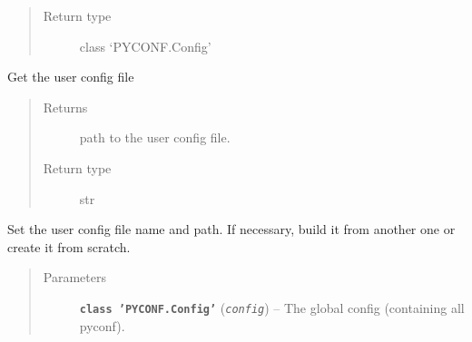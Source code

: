 \documentclass[a4paper,10pt,english]{sphinxmanual}
\begin{document}
\begin{fulllineitems}
\begin{fulllineitems}
\begin{quote}
\begin{description}
\item[{Return type}] \leavevmode
class `PYCONF.Config'

\end{description}\end{quote}

\end{fulllineitems}


\begin{fulllineitems}
\label{commands/apidoc/src:src.configManager.ConfigManager.get_user_config_file}
Get the user config file
\begin{quote}\begin{description}
\item[{Returns}] \leavevmode
path to the user config file.

\item[{Return type}] \leavevmode
str

\end{description}\end{quote}

\end{fulllineitems}


\begin{fulllineitems}
\label{commands/apidoc/src:src.configManager.ConfigManager.set_user_config_file}
Set the user config file name and path.
If necessary, build it from another one or create it from scratch.
\begin{quote}\begin{description}
\item[{Parameters}] \leavevmode
\textbf{\texttt{class 'PYCONF.Config'}} (\emph{\texttt{config}}) -- The global config (containing all pyconf).

\end{description}\end{quote}

\end{fulllineitems}


\end{fulllineitems}

\end{document}
